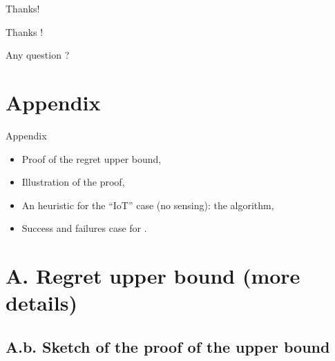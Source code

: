 \documentclass[12pt,english,ignorenonframetext,aspectratio=169,]{beamer}
\newcommand{\Fontify}{}
\providecommand{\tightlist}{%
  \setlength{\itemsep}{0pt}\setlength{\parskip}{0pt}}
\begin{document}
\begin{frame}{Thanks!}

\begin{center}\begin{Huge}
  {\Fontify Thanks !}
  \Smiley[0.9]
\end{Huge}\end{center}

\vspace*{20pt}

\begin{center}\begin{Huge}
  {\Fontify Any question ?}
\end{Huge}\end{center}

\end{frame}


\appendix{}


\section{\hfill{}Appendix\hfill{}}

\begin{frame}{Appendix}

\begin{itemize}\tightlist
\item
  Proof of the regret upper bound,
\item
  Illustration of the proof,
\item
  An heuristic for the ``IoT'' case (no sensing): the \Selfish{} algorithm,
\item
  Success and failures case for \Selfish{}.
\end{itemize}

\end{frame}


\section{\hfill{}A. Regret upper bound (more details)\hfill{}}

\subsection{\hfill{}A.b. Sketch of the proof of the upper bound\hfill{}}
\end{document}
